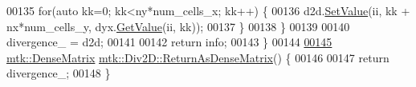 \begin{DoxyCode}
00135     \textcolor{keywordflow}{for}(\textcolor{keyword}{auto} kk=0; kk<ny*num\_cells\_x; kk++) \{
00136       d2d.\hyperlink{classmtk_1_1DenseMatrix_ae0f873a6d3a734da467cafb817da64ae}{SetValue}(ii, kk + nx*num\_cells\_y, dyx.\hyperlink{classmtk_1_1DenseMatrix_a87fb785713c04b13767947cc3325ce7c}{GetValue}(ii, kk));
00137     \}
00138   \}
00139 
00140   divergence\_ = d2d;
00141 
00142   \textcolor{keywordflow}{return} info;
00143 \}
00144 
\hypertarget{mtk__div__2d_8cc_source_l00145}{}\hyperlink{classmtk_1_1Div2D_ae27437bb5ebb5552a786e501e4dcf51e}{00145} \hyperlink{classmtk_1_1DenseMatrix}{mtk::DenseMatrix} \hyperlink{classmtk_1_1Div2D_ae27437bb5ebb5552a786e501e4dcf51e}{mtk::Div2D::ReturnAsDenseMatrix}() \{
00146 
00147   \textcolor{keywordflow}{return} divergence\_;
00148 \}
\end{DoxyCode}
